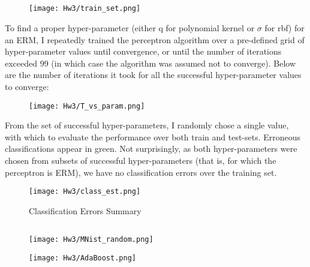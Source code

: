 \subsection{}

\begin{figure}[H]
    \centering\texttt{[image: Hw3/train\_set.png]}
\end{figure}

To find a proper hyper-parameter (either q for polynomial kernel or $\sigma$ for rbf) for an ERM, I repeatedly trained the perceptron algorithm over a pre-defined grid of hyper-parameter values until convergence, or until the number of iterations exceeded 99 (in which case the algorithm was assumed not to converge). Below are the number of iterations it took for all the successful hyper-parameter values to converge:

\begin{figure}[H]
    \centering\texttt{[image: Hw3/T\_vs\_param.png]}
\end{figure}

From the set of successful hyper-parameters, I randomly chose a single value, with which to evaluate the performance over both train and test-sets. Erroneous classifications appear in green.
Not surprisingly, as both hyper-parameters were chosen from subsets of successful hyper-parameters (that is, for which the perceptron is ERM), we have no classification errors over the training set.

\begin{figure}[H]
    \centering\texttt{[image: Hw3/class\_est.png]}
\end{figure}

\begin{figure}
    \centering{}
    \caption{Classification Errors Summary}
\end{figure}
\begin{center}
\end{center}

\subsection{}
\begin{figure}[H]
    \texttt{[image: Hw3/MNist\_random.png]}
\end{figure}

\begin{figure}[H]
    \texttt{[image: Hw3/AdaBoost.png]}
\end{figure}
